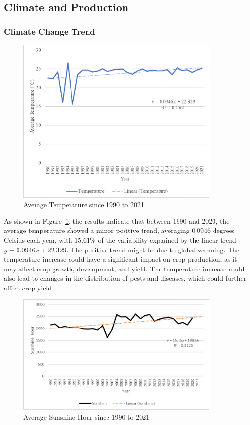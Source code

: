 \subsection{Climate and Production}

\subsubsection{Climate Change Trend}
\begin{figure}[H]
    \centering
    \caption{Average Temperature since 1990 to 2021} 
    \label{fig:trend_avg_temp}
    \includegraphics[width=0.9\textwidth]{images/trend_avg_temp.png}
\end{figure}

As shown in Figure~\ref{fig:trend_avg_temp}, the results indicate that between 1990 and 2020, the average temperature showed a minor positive trend, averaging 0.0946 degrees Celsius each year, with 15.61\% of the variability explained by the linear trend \( y = 0.0946x + 22.329 \). The positive trend might be due to global warming. The temperature increase could have a significant impact on crop production, as it may affect crop growth, development, and yield. The temperature increase could also lead to changes in the distribution of pests and diseases, which could further affect crop yield.

\begin{figure}[H]
    \centering
    \caption{Average Sunshine Hour since 1990 to 2021} 
    \label{fig:trend_avg_sunshine_hour}
    \includegraphics[width=0.9\textwidth]{images/trend_avg_sunshine_hour.png}
\end{figure}

